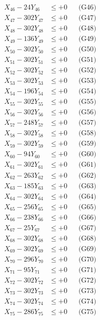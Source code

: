 \documentclass[a4paper,10pt]{article}
\begin{document}
{\begin{align}
X_{46} - 24Y_{46} &\leq +0 && \text{(G46)} \\
X_{47} - 302Y_{47} &\leq +0 && \text{(G47)} \\
X_{48} - 302Y_{48} &\leq +0 && \text{(G48)} \\
X_{49} - 136Y_{49} &\leq +0 && \text{(G49)} \\
X_{50} - 302Y_{50} &\leq +0 && \text{(G50)} \\
\allowbreak
X_{51} - 302Y_{51} &\leq +0 && \text{(G51)} \\
X_{52} - 302Y_{52} &\leq +0 && \text{(G52)} \\
X_{53} - 302Y_{53} &\leq +0 && \text{(G53)} \\
X_{54} - 196Y_{54} &\leq +0 && \text{(G54)} \\
X_{55} - 302Y_{55} &\leq +0 && \text{(G55)} \\
X_{56} - 302Y_{56} &\leq +0 && \text{(G56)} \\
X_{57} - 248Y_{57} &\leq +0 && \text{(G57)} \\
X_{58} - 302Y_{58} &\leq +0 && \text{(G58)} \\
X_{59} - 302Y_{59} &\leq +0 && \text{(G59)} \\
X_{60} - 94Y_{60} &\leq +0 && \text{(G60)} \\
\allowbreak
X_{61} - 302Y_{61} &\leq +0 && \text{(G61)} \\
X_{62} - 263Y_{62} &\leq +0 && \text{(G62)} \\
X_{63} - 185Y_{63} &\leq +0 && \text{(G63)} \\
X_{64} - 302Y_{64} &\leq +0 && \text{(G64)} \\
X_{65} - 256Y_{65} &\leq +0 && \text{(G65)} \\
X_{66} - 238Y_{66} &\leq +0 && \text{(G66)} \\
X_{67} - 25Y_{67} &\leq +0 && \text{(G67)} \\
X_{68} - 302Y_{68} &\leq +0 && \text{(G68)} \\
X_{69} - 302Y_{69} &\leq +0 && \text{(G69)} \\
X_{70} - 296Y_{70} &\leq +0 && \text{(G70)} \\
\allowbreak
X_{71} - 95Y_{71} &\leq +0 && \text{(G71)} \\
X_{72} - 302Y_{72} &\leq +0 && \text{(G72)} \\
X_{73} - 302Y_{73} &\leq +0 && \text{(G73)} \\
X_{74} - 302Y_{74} &\leq +0 && \text{(G74)} \\
X_{75} - 286Y_{75} &\leq +0 && \text{(G75)} \\

\end{align}}
\end{document}
